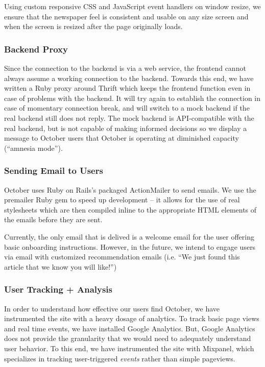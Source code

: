 \documentclass[11pt,letterpaper]{article}
\begin{document}
Using custom responsive CSS and JavaScript event handlers on window resize, we ensure that the newspaper feel is consistent and usable on any size screen and when the screen is resized after the page originally loads.

\subsubsection{Backend Proxy}

Since the connection to the backend is via a web service, the frontend cannot always assume a working connection to the backend.
Towards this end, we have written a Ruby proxy around Thrift which keeps the frontend function even in case of problems with the backend.
It will try again to establish the connection in case of momentary connection break, and will switch to a mock backend if the real backend still does not reply. The mock backend is API-compatible with the real backend, but is not capable of making informed decisions so we display a message to October users that October is operating at diminished capacity (``amnesia mode'').

\subsubsection{Sending Email to Users}
October uses Ruby on Rails's packaged ActionMailer to send emails.
We use the premailer Ruby gem to speed up development -- it allows for the use of real stylesheets which are then compiled inline to the appropriate HTML elements of the emails before they are sent.

Currently, the only email that is delived is a welcome email for the user offering basic onboarding instructions.
However, in the future, we intend to engage users via email with customized recommendation emails (i.e. ``We just found this article that we know you will like!'')

\subsubsection{User Tracking + Analysis}
\label{sec:tracking}
In order to understand how effective our users find October, we have instrumented the site with a heavy dosage of analytics.
To track basic page views and real time events, we have installed Google Analytics.
But, Google Analytics does not provide the granularity that we would need to adequately understand user behavior.
To this end, we have instrumented the site with Mixpanel\cite{mixpanel}, which specializes in tracking user-triggered \textit{events} rather than simple pageviews.
\end{document}
